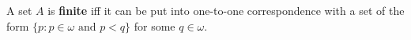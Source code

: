 A set $A$ is \textbf{finite} iff it can be put into one-to-one correspondence with a set of the form $\{p : p \in \omega \text{ and } p < q\}$ for some $q \in \omega$.
